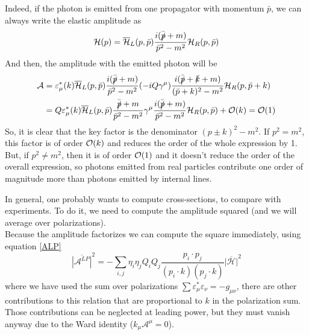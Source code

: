\documentclass{article}
\newcommand{\s}[1]{\slashed #1}
\begin{document}
Indeed, if the photon is emitted from one propagator with momentum $\bar{p}$,
we can always write the elastic amplitude as
\begin{equation}
	\mathcal{H}(p)
	= \overline{\mathcal{H}}_L(p, \bar{p})
	\frac{i(\bar{\s{p}} + m)}{\bar{p}^2 - m^2} \mathcal{H}_R(p, \bar{p})
\end{equation}
And then, the amplitude with the emitted photon will be
\begin{align*}
	\mathcal{A} &
	= \varepsilon^*_\mu(k) \overline{\mathcal{H}}_L(p, \bar{p})
	\frac{i(\bar{\s{p}} + m)}{\bar{p}^2 - m^2} (-i Q \gamma^\mu)
	\frac{i(\bar{\s{p}} + \s{k} + m)}{(\bar{p} + k)^2 - m^2}
	\mathcal{H}_R(p, \bar{p}+k)\\&
	= Q \varepsilon^*_\mu(k) \overline{\mathcal{H}}_L(p, \bar{p})
	\frac{\bar{\s{p}} + m}{\bar{p}^2 - m^2} \gamma^\mu
	\frac{i(\bar{\s{p}} + m)}{\bar{p}^2 - m^2} \mathcal{H}_R(p, \bar{p})
	+ \order{k}
	= \order{1}
\end{align*}
So, it is clear that the key factor is the denominator $(p \pm k)^2 - m^2$.
If $p^2 = m^2$, this factor is of order $\order{k}$
and reduces the order of the whole expression by 1.
But, if $p^2\neq m^2$, then it is of order $\order{1}$
and it doesn't reduce the order of the overall expression,
so photons emitted from real particles contribute one order of magnitude more
than photons emitted by internal lines.

In general, one probably wants to compute cross-sections, to compare with experiments.
To do it, we need to compute the amplitude squared
(and we will average over polarizations).
\\
Because the amplitude factorizes we can compute the square immediately,
using equation \eqref{ALP}
\begin{equation}\label{A2LP}
	\overline{|\mathcal{A}^{LP}|}^2
	= - \sum_{i, j} \eta_i \eta_j Q_i Q_j
	\frac{p_i \cdot p_j}{(p_i \cdot k)(p_j \cdot k)}
	\overline{|\mathcal{H}|}^2
\end{equation}
where we have used the sum over polarizations
$\sum \varepsilon_\mu^* \varepsilon_\nu = -g_{\mu \nu}$,
there are other contributions to this relation that are
proportional to $k$ in the polarization sum.
Those contributions can be neglected at leading power,
but they must vanish anyway due to the Ward identity ($k_\mu \mathcal{A}^\mu = 0$).
\end{document}
